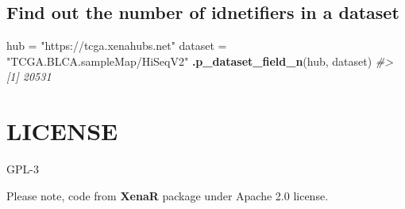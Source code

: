 \documentclass[nofonts,]{tufte-handout}
\newenvironment{Shaded}{\begin{snugshade}}{\end{snugshade}}
\newcommand{\CommentTok}[1]{\textcolor[rgb]{0.56,0.35,0.01}{\textit{#1}}}
\newcommand{\KeywordTok}[1]{\textcolor[rgb]{0.13,0.29,0.53}{\textbf{#1}}}
\newcommand{\NormalTok}[1]{#1}
\newcommand{\OperatorTok}[1]{\textcolor[rgb]{0.81,0.36,0.00}{\textbf{#1}}}
\newcommand{\StringTok}[1]{\textcolor[rgb]{0.31,0.60,0.02}{#1}}
\begin{document}
\begin{Shaded}
\end{Shaded}

\hypertarget{find-out-the-number-of-idnetifiers-in-a-dataset}{%
\subsection{Find out the number of idnetifiers in a
dataset}\label{find-out-the-number-of-idnetifiers-in-a-dataset}}

\begin{Shaded}
\begin{Highlighting}[]
\NormalTok{hub =}\StringTok{ "https://tcga.xenahubs.net"}
\NormalTok{dataset =}\StringTok{ "TCGA.BLCA.sampleMap/HiSeqV2"}
\KeywordTok{.p_dataset_field_n}\NormalTok{(hub, dataset)}
\CommentTok{#> [1] 20531}
\end{Highlighting}
\end{Shaded}

\hypertarget{license}{%
\section{LICENSE}\label{license}}

GPL-3

Please note, code from \textbf{XenaR} package under Apache 2.0 license.
\end{document}
